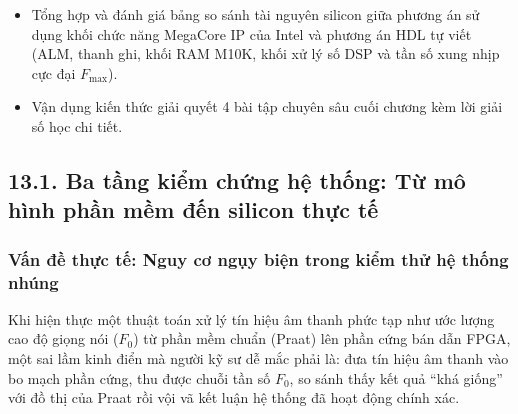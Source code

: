 \begin{learningobj}
\begin{itemize}
    \item Tổng hợp và đánh giá bảng so sánh tài nguyên silicon giữa phương án sử dụng khối chức năng MegaCore IP của Intel và phương án HDL tự viết (ALM, thanh ghi, khối RAM M10K, khối xử lý số DSP và tần số xung nhịp cực đại $F_{\max}$).
    \item Vận dụng kiến thức giải quyết 4 bài tập chuyên sâu cuối chương kèm lời giải số học chi tiết.
\end{itemize}
\end{learningobj}

\subsection*{13.1. Ba tầng kiểm chứng hệ thống: Từ mô hình phần mềm đến silicon thực tế}

\subsubsection*{Vấn đề thực tế: Nguy cơ ngụy biện trong kiểm thử hệ thống nhúng}
Khi hiện thực một thuật toán xử lý tín hiệu âm thanh phức tạp như ước lượng cao độ giọng nói ($F_0$) từ phần mềm chuẩn (Praat) lên phần cứng bán dẫn FPGA, một sai lầm kinh điển mà người kỹ sư dễ mắc phải là: đưa tín hiệu âm thanh vào bo mạch phần cứng, thu được chuỗi tần số $F_0$, so sánh thấy kết quả ``khá giống'' với đồ thị của Praat rồi vội vã kết luận hệ thống đã hoạt động chính xác.

